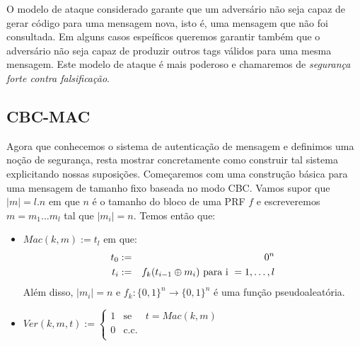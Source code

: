 O modelo de ataque considerado garante que um adversário não seja capaz de gerar código para uma mensagem nova, isto é, uma mensagem que não foi consultada.
Em alguns casos espeíficos queremos garantir também que o adversário não seja capaz de produzir outros tags válidos para uma mesma mensagem.
Este modelo de ataque é mais poderoso e chamaremos de {\em segurança forte contra falsificação}.

\subsection{CBC-MAC}
\label{sec:cbc-mac}

Agora que conhecemos o sistema de autenticação de mensagem e definimos uma noção de segurança, resta mostrar concretamente como construir tal sistema explicitando nossas suposições.
Começaremos com uma construção básica para uma mensagem de tamanho fixo baseada no modo CBC.
Vamos supor que $|m| = l.n$ em que $n$ é o tamanho do bloco de uma PRF $f$ e escreveremos $m = m_1 \dots m_l$ tal que $|m_i| = n$.
Temos então que:


\begin{itemize}
\item $Mac(k, m) := t_l$ em que:
  \begin{eqnarray*}
  t_0 & := & 0^n \\
  t_i & := & f_k(t_{i-1} \oplus m_i) \textrm{ para i } = 1, \dots, l 
  \end{eqnarray*}
 Além disso, $|m_i| = n$ e $f_k: \{0,1\}^n \to \{0,1\}^n$ é uma função pseudoaleatória.
\item $Ver(k, m, t) :=  \left\{
    \begin{array}{lcl}
      1 & \textrm{se} & t = Mac(k,m)\\
      0 & \textrm{c.c.} &\\
    \end{array}
    \right.$
  \end{itemize}

\begin{center}
\end{center}


